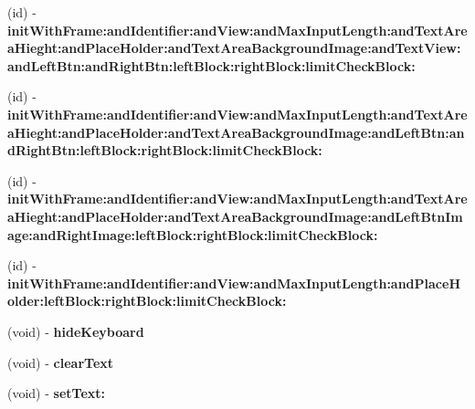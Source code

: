 \begin{DoxyCompactItemize}
\item 
\hypertarget{interface_m_text_view_aa09268adddd302ca09f2cf1eff0e92cc}{}(id) -\/ {\bfseries init\+With\+Frame\+:and\+Identifier\+:and\+View\+:and\+Max\+Input\+Length\+:and\+Text\+Area\+Hieght\+:and\+Place\+Holder\+:and\+Text\+Area\+Background\+Image\+:and\+Text\+View\+:and\+Left\+Btn\+:and\+Right\+Btn\+:left\+Block\+:right\+Block\+:limit\+Check\+Block\+:}\label{interface_m_text_view_aa09268adddd302ca09f2cf1eff0e92cc}

\item 
\hypertarget{interface_m_text_view_a3d5f911391ea93c03ed98c7d4f2fe5b3}{}(id) -\/ {\bfseries init\+With\+Frame\+:and\+Identifier\+:and\+View\+:and\+Max\+Input\+Length\+:and\+Text\+Area\+Hieght\+:and\+Place\+Holder\+:and\+Text\+Area\+Background\+Image\+:and\+Left\+Btn\+:and\+Right\+Btn\+:left\+Block\+:right\+Block\+:limit\+Check\+Block\+:}\label{interface_m_text_view_a3d5f911391ea93c03ed98c7d4f2fe5b3}

\item 
\hypertarget{interface_m_text_view_ae38449e7cb860c3efa94f3e730dfde13}{}(id) -\/ {\bfseries init\+With\+Frame\+:and\+Identifier\+:and\+View\+:and\+Max\+Input\+Length\+:and\+Text\+Area\+Hieght\+:and\+Place\+Holder\+:and\+Text\+Area\+Background\+Image\+:and\+Left\+Btn\+Image\+:and\+Right\+Image\+:left\+Block\+:right\+Block\+:limit\+Check\+Block\+:}\label{interface_m_text_view_ae38449e7cb860c3efa94f3e730dfde13}

\item 
\hypertarget{interface_m_text_view_aefda0d53f7c85a566907f02e7db89a49}{}(id) -\/ {\bfseries init\+With\+Frame\+:and\+Identifier\+:and\+View\+:and\+Max\+Input\+Length\+:and\+Place\+Holder\+:left\+Block\+:right\+Block\+:limit\+Check\+Block\+:}\label{interface_m_text_view_aefda0d53f7c85a566907f02e7db89a49}

\item 
\hypertarget{interface_m_text_view_a9ca196dbbdaa3a08120dc31c6c670acd}{}(void) -\/ {\bfseries hide\+Keyboard}\label{interface_m_text_view_a9ca196dbbdaa3a08120dc31c6c670acd}

\item 
\hypertarget{interface_m_text_view_ae0f72f15e230361ec4aa4020777e4449}{}(void) -\/ {\bfseries clear\+Text}\label{interface_m_text_view_ae0f72f15e230361ec4aa4020777e4449}

\item 
\hypertarget{interface_m_text_view_a6c5930a3bec9ccb3c05ad439eca325b9}{}(void) -\/ {\bfseries set\+Text\+:}\label{interface_m_text_view_a6c5930a3bec9ccb3c05ad439eca325b9}


\end{DoxyCompactItemize}
